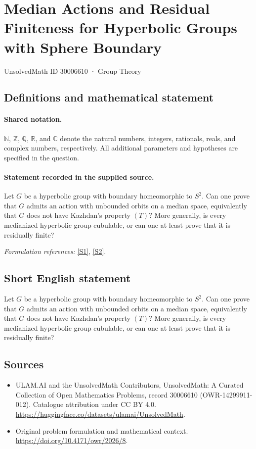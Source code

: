 \documentclass[11pt]{article}
\newcommand{\sref}[2]{\hyperlink{source:#1:#2}{[S#2]}}
\begin{document}
\setcounter{section}{30006609}
\section{Median Actions and Residual Finiteness for Hyperbolic Groups with Sphere Boundary}\label{30006610}
{\small UnsolvedMath ID 30006610 · Group Theory}
\subsection{Definitions and mathematical statement}

\paragraph{Shared notation.}$\mathbb N$, $\mathbb Z$, $\mathbb Q$, $\mathbb R$, and $\mathbb C$ denote the natural numbers, integers, rationals, reals, and complex numbers, respectively. All additional parameters and hypotheses are specified in the question.


\paragraph{Statement recorded in the supplied source.}
Let $G$ be a hyperbolic group with boundary homeomorphic to $S^2$. Can one prove that $G$ admits an action with unbounded orbits on a median space, equivalently that $G$ does not have Kazhdan's property $(T)$? More generally, is every medianized hyperbolic group cubulable, or can one at least prove that it is residually finite?
\par\smallskip\textit{Formulation references:} \sref{30006610}{1}, \sref{30006610}{2}.
\subsection{Short English statement}
Let $G$ be a hyperbolic group with boundary homeomorphic to $S^2$. Can one prove that $G$ admits an action with unbounded orbits on a median space, equivalently that $G$ does not have Kazhdan's property $(T)$? More generally, is every medianized hyperbolic group cubulable, or can one at least prove that it is residually finite?
\subsection{Sources}
\begin{itemize}
\item[\hypertarget{source:30006610:1}{S1}] ULAM.AI and the UnsolvedMath Contributors, UnsolvedMath: A Curated Collection of Open Mathematics Problems, record 30006610 (OWR-14299911-012). Catalogue attribution under CC BY 4.0.
\url{https://huggingface.co/datasets/ulamai/UnsolvedMath}.
\item[\hypertarget{source:30006610:2}{S2}] Original problem formulation and mathematical context.
\url{https://doi.org/10.4171/owr/2026/8}.
\end{itemize}
\label{end:30006610}
\end{document}
